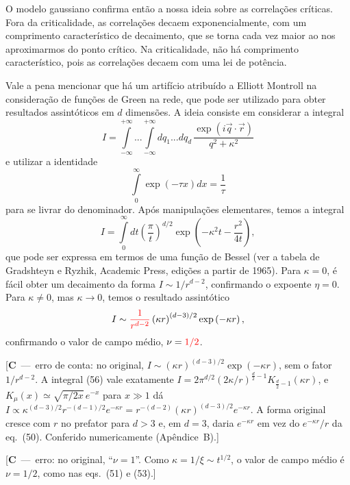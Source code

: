 \documentclass[12pt,a4paper]{article}
\newcommand{\corr}[1]{\textcolor{red}{#1}}
\newcounter{corr}
\newcommand{\nota}[2]{\refstepcounter{corr}\label{#1}%
  {\color{red}\small[\textbf{C\thecorr}~---~#2]}}
\begin{document}
O modelo gaussiano confirma então a nossa ideia sobre as correlações
críticas. Fora da criticalidade, as correlações decaem exponencialmente, com
um comprimento característico de decaimento, que se torna cada vez maior
ao nos aproximarmos do ponto crítico. Na criticalidade, não há comprimento
característico, pois as correlações decaem com uma lei de potência.

Vale a pena mencionar que há um artifício atribuído a Elliott Montroll
na consideração de funções de Green na rede, que pode ser utilizado para
obter resultados assintóticos em $d$ dimensões. A ideia consiste em considerar
a integral
\begin{equation}
I=\int\limits_{-\infty}^{+\infty}...\int\limits_{-\infty}^{+\infty}dq_1...dq_d\,\frac{\exp\left(i\vec q\cdot\vec r\right)}{q^2+\kappa^2}
\end{equation}
e utilizar a identidade
\begin{equation}
\int\limits_0^{\infty}\exp\left(-\tau x\right)dx=\frac1\tau
\end{equation}
para se livrar do denominador. Após manipulações elementares, temos a
integral
\begin{equation}
I=\int\limits_0^{\infty}dt\left(\frac\pi t\right)^{d/2}\exp\left(-\kappa^2t-\frac{r^2}{4t}\right),
\end{equation}
que pode ser expressa em termos de uma função de Bessel (ver a tabela de
Gradshteyn e Ryzhik, Academic Press, edições a partir de 1965). Para $\kappa=0$,
é fácil obter um decaimento da forma $I\sim1/r^{d-2}$, confirmando o expoente
$\eta=0$. Para $\kappa\neq0$, mas $\kappa\to0$, temos o resultado assintótico
\begin{equation}
I\sim\corr{\frac{1}{r^{d-2}}}\left(\kappa r\right)^{(d-3)/2}\exp\left(-\kappa r\right),
\end{equation}
confirmando o valor de campo médio, $\nu=\corr{1/2}$.

\noindent\nota{c:i57}{erro de conta: no original, $I\sim(\kappa r)^{(d-3)/2}\exp(-\kappa r)$, sem o
fator $1/r^{d-2}$. A integral (56) vale exatamente
$I=2\pi^{d/2}\left(2\kappa/r\right)^{\frac d2-1}K_{\frac d2-1}(\kappa r)$, e
$K_\mu(x)\simeq\sqrt{\pi/2x}\,e^{-x}$ para $x\gg1$ dá
$I\propto\kappa^{(d-3)/2}r^{-(d-1)/2}e^{-\kappa r}=r^{-(d-2)}(\kappa r)^{(d-3)/2}e^{-\kappa r}$.
A forma original cresce com $r$ no prefator para $d>3$ e, em $d=3$, daria $e^{-\kappa r}$
em vez do $e^{-\kappa r}/r$ da eq.~(50). Conferido numericamente (Apêndice~B).}

\noindent\nota{c:nu57}{erro: no original, ``$\nu=1$''. Como $\kappa=1/\xi\sim t^{1/2}$, o valor
de campo médio é $\nu=1/2$, como nas eqs.~(51) e (53).}
\end{document}
